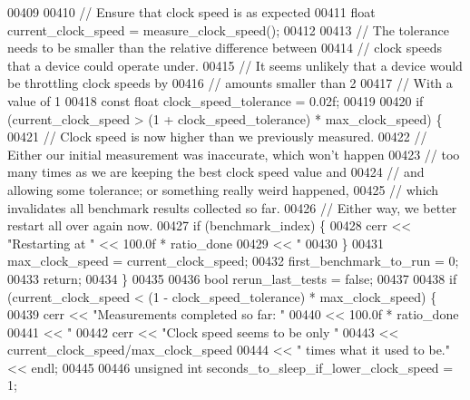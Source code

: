 \begin{DoxyCode}
00409 
00410       \textcolor{comment}{// Ensure that clock speed is as expected}
00411       \textcolor{keywordtype}{float} current\_clock\_speed = measure\_clock\_speed();
00412 
00413       \textcolor{comment}{// The tolerance needs to be smaller than the relative difference between}
00414       \textcolor{comment}{// clock speeds that a device could operate under.}
00415       \textcolor{comment}{// It seems unlikely that a device would be throttling clock speeds by}
00416       \textcolor{comment}{// amounts smaller than 2%
00417       \textcolor{comment}{// With a value of 1%
00418       \textcolor{keyword}{const} \textcolor{keywordtype}{float} clock\_speed\_tolerance = 0.02f;
00419 
00420       \textcolor{keywordflow}{if} (current\_clock\_speed > (1 + clock\_speed\_tolerance) * max\_clock\_speed) \{
00421         \textcolor{comment}{// Clock speed is now higher than we previously measured.}
00422         \textcolor{comment}{// Either our initial measurement was inaccurate, which won't happen}
00423         \textcolor{comment}{// too many times as we are keeping the best clock speed value and}
00424         \textcolor{comment}{// and allowing some tolerance; or something really weird happened,}
00425         \textcolor{comment}{// which invalidates all benchmark results collected so far.}
00426         \textcolor{comment}{// Either way, we better restart all over again now.}
00427         \textcolor{keywordflow}{if} (benchmark\_index) \{
00428           cerr << \textcolor{stringliteral}{"Restarting at "} << 100.0f * ratio\_done
00429                << \textcolor{stringliteral}{" %
00430         \}
00431         max\_clock\_speed = current\_clock\_speed;
00432         first\_benchmark\_to\_run = 0;
00433         \textcolor{keywordflow}{return};
00434       \}
00435 
00436       \textcolor{keywordtype}{bool} rerun\_last\_tests = \textcolor{keyword}{false};
00437 
00438       \textcolor{keywordflow}{if} (current\_clock\_speed < (1 - clock\_speed\_tolerance) * max\_clock\_speed) \{
00439         cerr << \textcolor{stringliteral}{"Measurements completed so far: "}
00440              << 100.0f * ratio\_done
00441              << \textcolor{stringliteral}{" %
00442         cerr << \textcolor{stringliteral}{"Clock speed seems to be only "}
00443              << current\_clock\_speed/max\_clock\_speed
00444              << \textcolor{stringliteral}{" times what it used to be."} << endl;
00445 
00446         \textcolor{keywordtype}{unsigned} \textcolor{keywordtype}{int} seconds\_to\_sleep\_if\_lower\_clock\_speed = 1;
}}}}
\end{DoxyCode}
